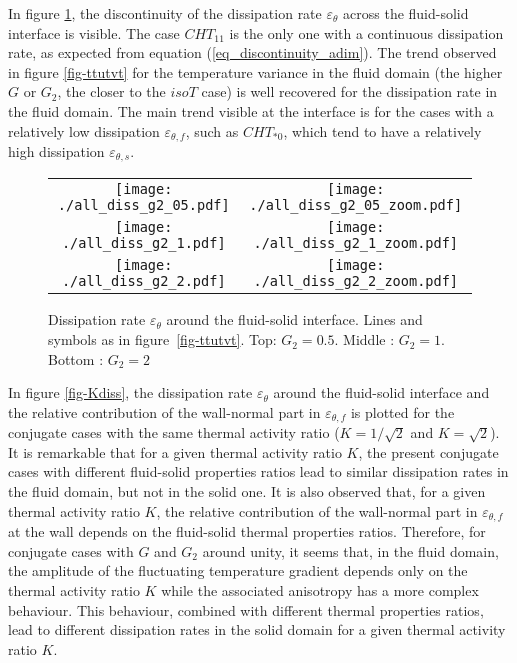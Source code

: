 \documentclass[review]{elsarticle}
\begin{document}

In figure \ref{fig-diss}, the discontinuity of the dissipation rate $\varepsilon_\theta$ across the fluid-solid interface is visible.
The case $CHT_{11}$ is the only one with a continuous dissipation rate, as expected from equation (\ref{eq_discontinuity_adim}).
The trend observed in figure \ref{fig-ttutvt} for the temperature variance in the fluid domain (the higher $G$ or $G_2$, the closer to the $isoT$ case) is well recovered for the dissipation rate in the fluid domain.
The main trend visible at the interface is for the cases with a relatively low dissipation $\varepsilon_{\theta,f}$, such as $CHT_{*0}$, which tend to have a relatively high dissipation $\varepsilon_{\theta,s}$.

\begin{figure}[htbp]
\centering
\begin{tabular}{cc}
\texttt{[image: ./all\_diss\_g2\_05.pdf]} &
\texttt{[image: ./all\_diss\_g2\_05\_zoom.pdf]} \\
\texttt{[image: ./all\_diss\_g2\_1.pdf]} &
\texttt{[image: ./all\_diss\_g2\_1\_zoom.pdf]} \\
\texttt{[image: ./all\_diss\_g2\_2.pdf]} &
\texttt{[image: ./all\_diss\_g2\_2\_zoom.pdf]}
\end{tabular}
\caption{Dissipation rate $\varepsilon_\theta$ around the fluid-solid interface. Lines and symbols as in figure~\ref{fig-ttutvt}. Top: $G_2=0.5$. Middle : $G_2=1$. Bottom : $G_2=2$}
\label{fig-diss}
\end{figure}

In figure \ref{fig-Kdiss}, the dissipation rate $\varepsilon_\theta$ around the fluid-solid interface and the relative contribution of the wall-normal part in $\varepsilon_{\theta,f}$ is plotted for the conjugate cases with the same thermal activity ratio ($K=1/\sqrt{2}$ and $K=\sqrt{2}$).
It is remarkable that for a given thermal activity ratio $K$, the present conjugate cases with different fluid-solid properties ratios lead to similar dissipation rates in the fluid domain, but not in the solid one.
It is also observed that, for a given thermal activity ratio $K$, the relative contribution of the wall-normal part in $\varepsilon_{\theta,f}$ at the wall depends on the fluid-solid thermal properties ratios.
Therefore, for conjugate cases with $G$ and $G_2$ around unity, it seems that, in the fluid domain, the amplitude of the fluctuating temperature gradient depends only on the thermal activity ratio $K$ while the associated anisotropy has a more complex behaviour.
This behaviour, combined with different thermal properties ratios, lead to different dissipation rates in the solid domain for a given thermal activity ratio $K$.
\end{document}
